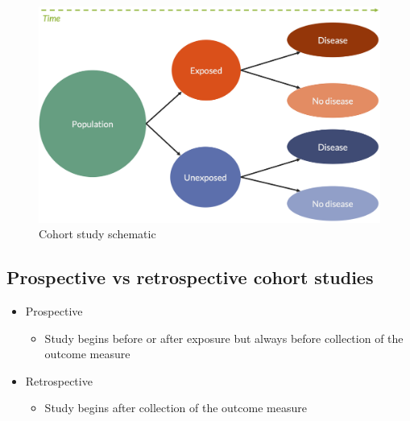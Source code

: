 \documentclass[
]{book}
\providecommand{\tightlist}{%
  \setlength{\itemsep}{0pt}\setlength{\parskip}{0pt}}
\begin{document}
\begin{figure}

{\centering \includegraphics[width=1\linewidth]{img/study_design/cohort_study_schematic} 

}

\caption{Cohort study schematic}\label{fig:unnamed-chunk-6}
\end{figure}

\hypertarget{prospective-vs-retrospective-cohort-studies}{%
\subsection{Prospective vs retrospective cohort studies}\label{prospective-vs-retrospective-cohort-studies}}

\begin{itemize}
\tightlist
\item
  Prospective

  \begin{itemize}
  \tightlist
  \item
    Study begins before or after exposure but always before collection of the outcome measure
  \end{itemize}
\item
  Retrospective

  \begin{itemize}
  \tightlist
  \item
    Study begins after collection of the outcome measure
  \end{itemize}
\end{itemize}
\end{document}
